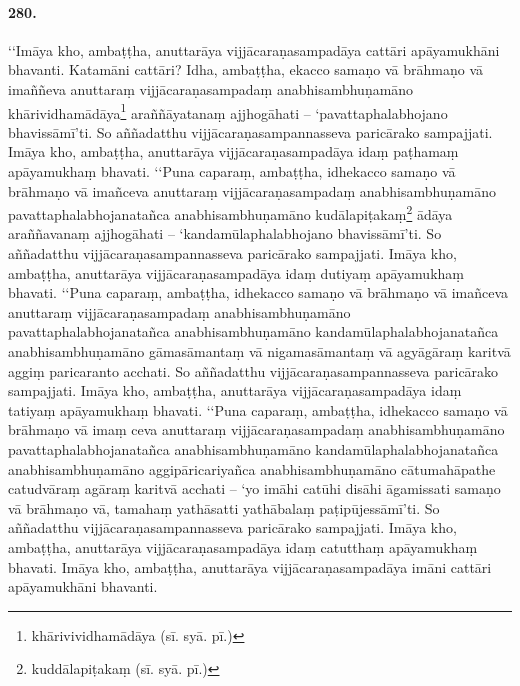 \paragraph{280.} ‘‘Imāya kho, ambaṭṭha, anuttarāya vijjācaraṇasampadāya cattāri apāyamukhāni bhavanti. Katamāni cattāri? Idha, ambaṭṭha, ekacco samaṇo vā brāhmaṇo vā imaññeva anuttaraṃ vijjācaraṇasampadaṃ anabhisambhuṇamāno khārividhamādāya\footnote{khārivividhamādāya (sī. syā. pī.)} araññāyatanaṃ ajjhogāhati – ‘pavattaphalabhojano bhavissāmī’ti. So aññadatthu vijjācaraṇasampannasseva paricārako sampajjati. Imāya kho, ambaṭṭha, anuttarāya vijjācaraṇasampadāya idaṃ paṭhamaṃ apāyamukhaṃ bhavati. ‘‘Puna caparaṃ, ambaṭṭha, idhekacco samaṇo vā brāhmaṇo vā imañceva anuttaraṃ vijjācaraṇasampadaṃ anabhisambhuṇamāno pavattaphalabhojanatañca anabhisambhuṇamāno kudālapiṭakaṃ\footnote{kuddālapiṭakaṃ (sī. syā. pī.)} ādāya araññavanaṃ ajjhogāhati – ‘kandamūlaphalabhojano bhavissāmī’ti. So aññadatthu vijjācaraṇasampannasseva paricārako sampajjati. Imāya kho, ambaṭṭha, anuttarāya vijjācaraṇasampadāya idaṃ dutiyaṃ apāyamukhaṃ bhavati. ‘‘Puna caparaṃ, ambaṭṭha, idhekacco samaṇo vā brāhmaṇo vā imañceva anuttaraṃ vijjācaraṇasampadaṃ anabhisambhuṇamāno pavattaphalabhojanatañca anabhisambhuṇamāno kandamūlaphalabhojanatañca anabhisambhuṇamāno gāmasāmantaṃ vā nigamasāmantaṃ vā agyāgāraṃ karitvā aggiṃ paricaranto acchati. So aññadatthu vijjācaraṇasampannasseva paricārako sampajjati. Imāya kho, ambaṭṭha, anuttarāya vijjācaraṇasampadāya idaṃ tatiyaṃ apāyamukhaṃ bhavati. ‘‘Puna caparaṃ, ambaṭṭha, idhekacco samaṇo vā brāhmaṇo vā imaṃ ceva anuttaraṃ vijjācaraṇasampadaṃ anabhisambhuṇamāno pavattaphalabhojanatañca anabhisambhuṇamāno kandamūlaphalabhojanatañca anabhisambhuṇamāno aggipāricariyañca anabhisambhuṇamāno cātumahāpathe catudvāraṃ agāraṃ karitvā acchati – ‘yo imāhi catūhi disāhi āgamissati samaṇo vā brāhmaṇo vā, tamahaṃ yathāsatti yathābalaṃ paṭipūjessāmī’ti. So aññadatthu vijjācaraṇasampannasseva paricārako sampajjati. Imāya kho, ambaṭṭha, anuttarāya vijjācaraṇasampadāya idaṃ catutthaṃ apāyamukhaṃ bhavati. Imāya kho, ambaṭṭha, anuttarāya vijjācaraṇasampadāya imāni cattāri apāyamukhāni bhavanti.

